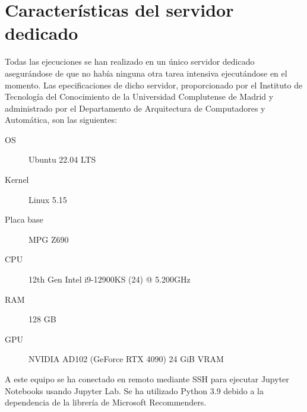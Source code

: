 \chapter{Características del servidor dedicado}
\label{ch:servidor}

Todas las ejecuciones se han realizado en un único servidor dedicado asegurándose de que no había ninguna otra tarea intensiva ejecutándose en el momento. Las epecificaciones de dicho servidor, proporcionado por el Instituto de Tecnología del Conocimiento de la Universidad Complutense de Madrid y administrado por el Departamento de Arquitectura de Computadores y Automática, son las siguientes:

\begin{description}
    \item[OS] Ubuntu 22.04 LTS
    \item[Kernel] Linux 5.15
    \item[Placa base] MPG Z690
    \item[CPU] 12th Gen Intel i9-12900KS (24) @ 5.200GHz
    \item[RAM] 128 GB 
    \item[GPU] NVIDIA AD102 (GeForce RTX 4090) 24 GiB VRAM
\end{description}

A este equipo se ha conectado en remoto mediante SSH para ejecutar Jupyter Notebooks usando Jupyter Lab. Se ha utilizado Python 3.9 debido a la dependencia de la librería de Microsoft Recommenders.
 